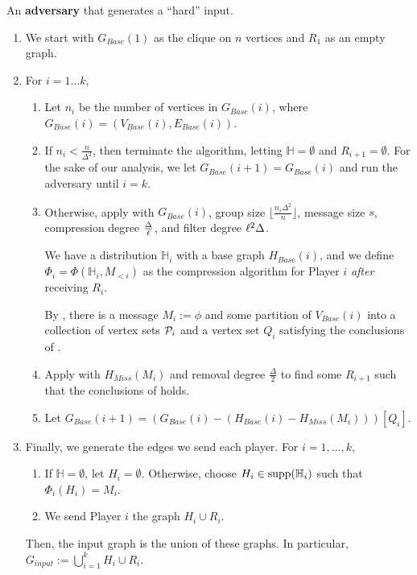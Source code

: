 \documentclass[11pt]{article}
\begin{document}
\begin{mdframed}
An \textbf{adversary} that generates a ``hard'' input. 

\begin{enumerate}
    \item\label{1} We start with $G_{Base}(1)$ as the clique on $n$ vertices and $R_1$ as an empty graph.
    \item For $i=1\dots k$,
        \begin{enumerate}
            \item Let $n_i$ be the number of vertices in $G_{Base}(i)$, where $G_{Base}(i)=(V_{Base}(i), E_{Base}(i))$. 
            \item If $n_i<\frac n{\Delta^2}$, then terminate the algorithm, letting $\mathbb{H}=\emptyset$ and $R_{i+1}=\emptyset$. For the sake of our analysis, we let $G_{Base}(i+1)=G_{Base}(i)$ and run the adversary until $i=k$. 
            \item Otherwise, apply  with $G_{Base}(i)$, group size $\lfloor\frac {n_i\Delta^2}n\rfloor$, message size $s$, compression degree $\frac {\Delta}{\ell}$, and filter degree ${\ell}^2\Delta$. 
            
            We have a distribution $\mathbb{H}_i$ with a base graph $H_{Base}(i)$, and we define $\Phi_i=\Phi(\mathbb{H}_i, M_{<i})$ as the compression algorithm for Player $i$ \textit{after} receiving $R_i$. 
            
            By , there is a message $M_i:=\phi$ and some partition of $V_{Base}(i)$ into a collection of vertex sets $\mathcal{P}_i$ and a vertex set $Q_i$ satisfying the conclusions of .

            \item Apply  with $H_{Miss}(M_i)$ and removal degree $\frac{\Delta}2$ to find some $R_{i+1}$ such that the conclusions of  holds. 
            
            \item Let $G_{Base}(i+1)=(G_{Base}(i)-(H_{Base}(i)-H_{Miss}(M_i)))[Q_i]$. 
        \end{enumerate}
        \item Finally, we generate the edges we send each player. For $i=1,\dots,k$,
        \begin{enumerate}
            \item If $\mathbb{H}=\emptyset$, let $H_i=\emptyset$. Otherwise, choose $H_i\in \textnormal{\text{supp}}(\mathbb{H}_i)$ such that $\Phi_i(H_i)=M_i$.
            \item We send Player $i$ the graph $H_i\cup R_i$. 
        \end{enumerate}
        Then, the input graph is the union of these graphs. In particular, $G_{input}:=\bigcup_{i=1}^k H_i\cup R_i$. 
\end{enumerate}
\end{mdframed}
\end{document}
